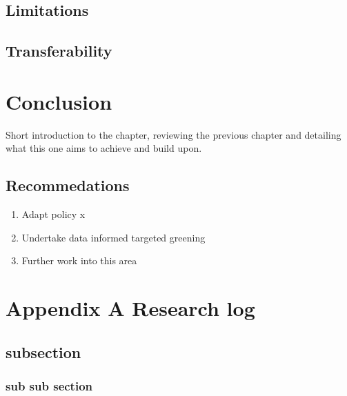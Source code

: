 \documentclass[
  12pt,
  oneside]{book}
\providecommand{\tightlist}{%
  \setlength{\itemsep}{0pt}\setlength{\parskip}{0pt}}
\begin{document}
\hypertarget{limitations}{%
\section{Limitations}\label{limitations}}

\hypertarget{transferability}{%
\section{Transferability}\label{transferability}}

\hypertarget{conclusion}{%
\chapter{Conclusion}\label{conclusion}}

Short introduction to the chapter, reviewing the previous chapter and detailing what this one aims to achieve and build upon.

\hypertarget{recommedations}{%
\section{Recommedations}\label{recommedations}}

\begin{enumerate}
\def\labelenumi{\arabic{enumi}.}
\tightlist
\item
  Adapt policy x
\item
  Undertake data informed targeted greening
\item
  Further work into this area
\end{enumerate}

\printbibliography

\hypertarget{appendix-a-research-log}{%
\chapter*{Appendix A Research log}\label{appendix-a-research-log}}


\hypertarget{subsection}{%
\section*{subsection}\label{subsection}}

\hypertarget{sub-sub-section}{%
\subsection*{sub sub section}\label{sub-sub-section}}
\end{document}
